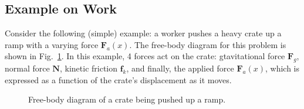 \documentclass[11pt]{article}
\begin{document}
\subsection{Example on Work}
Consider the following (simple) example: a worker pushes a heavy crate up a
ramp with a varying force $\mathbf F_a(x)$. The free-body diagram for this
problem is shown in Fig.~\ref{example-fbd}. In this example, 4 forces act on
the crate: gtavitational force $\mathbf F_g$, normal force $\mathbf N$, kinetic
friction $\mathbf f_k$, and finally, the applied force $\mathbf F_a(x)$, which
is expressed as a function of the crate's displacement as it moves.
\begin{figure}[ht]
  \centering
  \caption{Free-body diagram of a crate being pushed up a ramp.}
  \label{example-fbd}
\end{figure}
\end{document}
